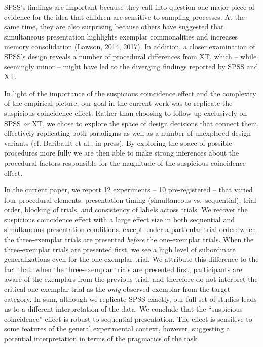 \documentclass[english,floatsintext,man]{apa6}
\theoremstyle{definition}
\theoremstyle{definition}
\theoremstyle{remark}
\begin{document}
SPSS's findings are important because they call into question one major
piece of evidence for the idea that children are sensitive to sampling
processes. At the same time, they are also surprising because others
have suggested that simultaneous presentation highlights exemplar
commonalities and increases memory consolidation (Lawson, 2014, 2017).
In addition, a closer examination of SPSS's design reveals a number of
procedural differences from XT, which -- while seemingly minor -- might
have led to the diverging findings reported by SPSS and XT.

In light of the importance of the suspicious coincidence effect and the
complexity of the empirical picture, our goal in the current work was to
replicate the suspicious coincidence effect. Rather than choosing to
follow up exclusively on SPSS \emph{or} XT, we chose to explore the
space of design decisions that connect them, effectively replicating
both paradigms as well as a number of unexplored design variants (cf.
Baribault et al., in press). By exploring the space of possible
procedures more fully we are then able to make strong inferences about
the procedural factors responsible for the magnitude of the suspicious
coincidence effect.

In the current paper, we report 12 experiments -- 10 pre-registered --
that varied four procedural elements: presentation timing (simultaneous
vs.~sequential), trial order, blocking of trials, and consistency of
labels across trials. We recover the suspicious coincidence effect with
a large effect size in both sequential and simultaneous presentation
conditions, except under a particular trial order: when the
three-exemplar trials are presented \emph{before} the one-exemplar
trials. When the three-exemplar trials are presented first, we see a
high level of subordinate generalizations even for the one-exemplar
trial. We attribute this difference to the fact that, when the
three-exemplar trials are presented first, participants are aware of the
exemplars from the previous trial, and therefore do not interpret the
critical one-exemplar trial as the \emph{only} observed exemplar from
the target category. In sum, although we replicate SPSS exactly, our
full set of studies leads us to a different interpretation of the data.
We conclude that the \enquote{suspicious coincidence} effect is robust
to sequential presentation. The effect is sensitive to some features of
the general experimental context, however, suggesting a potential
interpretation in terms of the pragmatics of the task.
\end{document}
